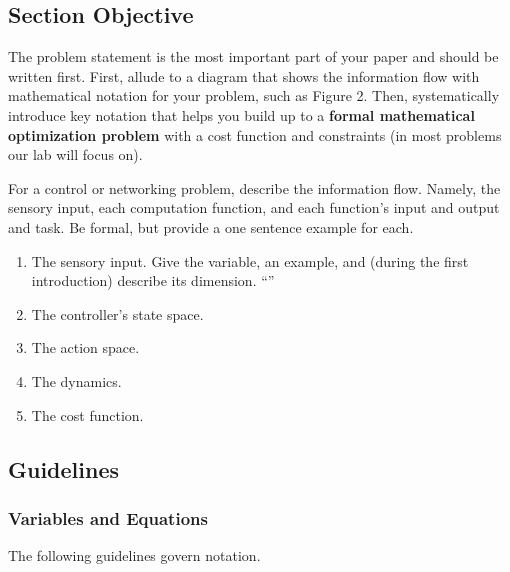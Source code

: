 \subsection{Section Objective}
The problem statement is the most important part of your paper and should be written first. First, allude to a diagram that shows the information flow with mathematical notation for your problem, such as Figure 2.
Then, systematically introduce key notation that helps you build up to a \textbf{formal mathematical optimization problem} with a cost function and constraints (in most problems our lab will focus on).

For a control or networking problem, describe the information flow. 
Namely, the sensory input, each computation function, and each function's input and output and task. Be formal, but provide a one sentence example for each.

\begin{enumerate}
    \item The sensory input.  Give the variable, an example,  and (during the first introduction) describe its dimension. ``''
    \item The controller's state space.
    \item The action space.
    \item The dynamics.
    \item The cost function.
\end{enumerate}

\subsection{Guidelines}

\subsubsection{Variables and Equations}

The following guidelines govern notation.


